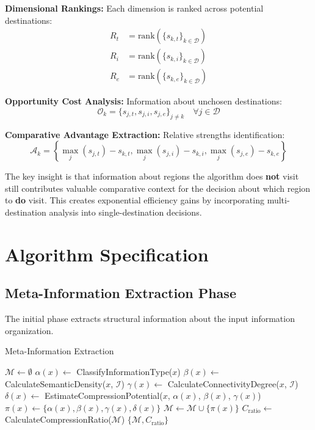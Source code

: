 \documentclass[12pt,a4paper]{article}
\begin{document}
\textbf{Dimensional Rankings:} Each dimension is ranked across potential destinations:
\begin{align}
R_t &= \text{rank}(\{s_{k,t}\}_{k \in \mathcal{D}}) \\
R_i &= \text{rank}(\{s_{k,i}\}_{k \in \mathcal{D}}) \\
R_e &= \text{rank}(\{s_{k,e}\}_{k \in \mathcal{D}})
\end{align}

\textbf{Opportunity Cost Analysis:} Information about unchosen destinations:
\begin{equation}
\mathcal{O}_k = \{s_{j,t}, s_{j,i}, s_{j,e}\}_{j \neq k} \quad \forall j \in \mathcal{D}
\end{equation}

\textbf{Comparative Advantage Extraction:} Relative strengths identification:
\begin{equation}
\mathcal{A}_k = \left\{\max_j(s_{j,t}) - s_{k,t}, \max_j(s_{j,i}) - s_{k,i}, \max_j(s_{j,e}) - s_{k,e}\right\}
\end{equation}

The key insight is that information about regions the algorithm does \textbf{not} visit still contributes valuable comparative context for the decision about which region to \textbf{do} visit. This creates exponential efficiency gains by incorporating multi-destination analysis into single-destination decisions.

\section{Algorithm Specification}

\subsection{Meta-Information Extraction Phase}

The initial phase extracts structural information about the input information organization.

\begin{algorithm}[H]
\caption{Meta-Information Extraction}
\begin{algorithmic}[1]
    \State $\mathcal{M} \leftarrow \emptyset$ 
        \State $\alpha(x) \leftarrow$ ClassifyInformationType($x$)
        \State $\beta(x) \leftarrow$ CalculateSemanticDensity($x$, $\mathcal{I}$)
        \State $\gamma(x) \leftarrow$ CalculateConnectivityDegree($x$, $\mathcal{I}$)
        \State $\delta(x) \leftarrow$ EstimateCompressionPotential($x$, $\alpha(x)$, $\beta(x)$, $\gamma(x)$)
        \State $\pi(x) \leftarrow \{\alpha(x), \beta(x), \gamma(x), \delta(x)\}$
        \State $\mathcal{M} \leftarrow \mathcal{M} \cup \{\pi(x)\}$
    \EndFor
    \State $C_{\text{ratio}} \leftarrow$ CalculateCompressionRatio($\mathcal{M}$)
    \State \Return $\{\mathcal{M}, C_{\text{ratio}}\}$
\EndProcedure
\end{algorithmic}
\end{algorithm}
\end{document}
